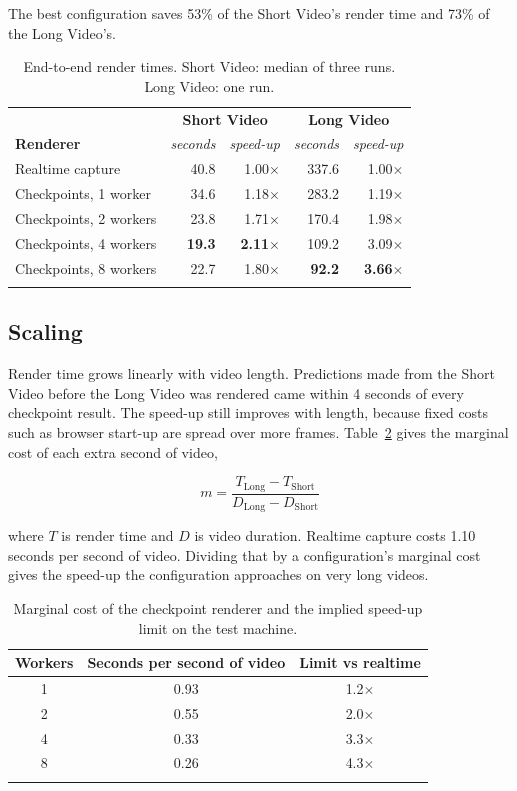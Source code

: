 \documentclass[11pt, a4paper]{article}
\begin{document}
\begin{appendices}
The best configuration saves 53\% of the Short Video's render time and 73\% of the Long Video's.

\begin{longtable}{|l|r|r|r|r|}
    \hline
    & \multicolumn{2}{c|}{\textbf{Short Video}} & \multicolumn{2}{c|}{\textbf{Long Video}} \\
    \textbf{Renderer} & \textit{seconds} & \textit{speed-up} & \textit{seconds} & \textit{speed-up} \\
    \hline
    Realtime capture & 40.8 & 1.00$\times$ & 337.6 & 1.00$\times$ \\
    \hline
    Checkpoints, 1 worker & 34.6 & 1.18$\times$ & 283.2 & 1.19$\times$ \\
    Checkpoints, 2 workers & 23.8 & 1.71$\times$ & 170.4 & 1.98$\times$ \\
    Checkpoints, 4 workers & \textbf{19.3} & \textbf{2.11$\times$} & 109.2 & 3.09$\times$ \\
    Checkpoints, 8 workers & 22.7 & 1.80$\times$ & \textbf{92.2} & \textbf{3.66$\times$} \\
    \hline
    \caption{End-to-end render times. Short Video: median of three runs. Long Video: one run.}
    \label{tab:render-times}
\end{longtable}

\subsection{Scaling}

Render time grows linearly with video length. Predictions made from the Short Video before the Long Video was rendered came within 4 seconds of every checkpoint result. The speed-up still improves with length, because fixed costs such as browser start-up are spread over more frames. Table~\ref{tab:marginal-cost} gives the marginal cost of each extra second of video,

\[
m = \frac{T_{\mathrm{Long}} - T_{\mathrm{Short}}}{D_{\mathrm{Long}} - D_{\mathrm{Short}}}
\]

where \(T\) is render time and \(D\) is video duration. Realtime capture costs 1.10 seconds per second of video. Dividing that by a configuration's marginal cost gives the speed-up the configuration approaches on very long videos.

\begin{longtable}{|c|c|c|}
    \hline
    \textbf{Workers} & \textbf{Seconds per second of video} & \textbf{Limit vs realtime} \\
    \hline
    1 & 0.93 & 1.2$\times$ \\
    2 & 0.55 & 2.0$\times$ \\
    4 & 0.33 & 3.3$\times$ \\
    8 & 0.26 & 4.3$\times$ \\
    \hline
    \caption{Marginal cost of the checkpoint renderer and the implied speed-up limit on the test machine.}
    \label{tab:marginal-cost}
\end{longtable}


\end{appendices}
\end{document}
